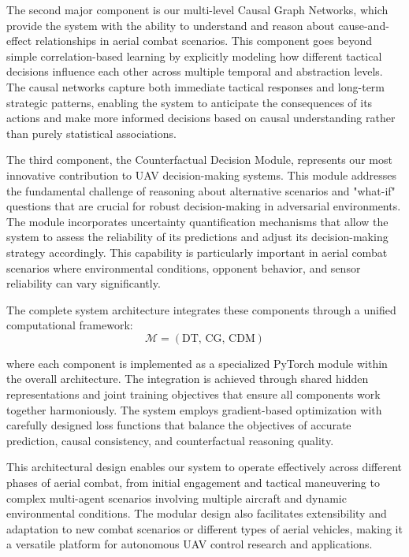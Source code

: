 \documentclass[12pt]{article}
\begin{document}
The second major component is our multi-level Causal Graph Networks, which provide the system with the ability to understand and reason about cause-and-effect relationships in aerial combat scenarios. This component goes beyond simple correlation-based learning by explicitly modeling how different tactical decisions influence each other across multiple temporal and abstraction levels. The causal networks capture both immediate tactical responses and long-term strategic patterns, enabling the system to anticipate the consequences of its actions and make more informed decisions based on causal understanding rather than purely statistical associations.

The third component, the Counterfactual Decision Module, represents our most innovative contribution to UAV decision-making systems. This module addresses the fundamental challenge of reasoning about alternative scenarios and "what-if" questions that are crucial for robust decision-making in adversarial environments. The module incorporates uncertainty quantification mechanisms that allow the system to assess the reliability of its predictions and adjust its decision-making strategy accordingly. This capability is particularly important in aerial combat scenarios where environmental conditions, opponent behavior, and sensor reliability can vary significantly.

The complete system architecture integrates these components through a unified computational framework:
\begin{equation}
\mathcal{M} = (\mathrm{DT},\, \mathrm{CG},\, \mathrm{CDM})
\end{equation}

where each component is implemented as a specialized PyTorch module within the overall architecture. The integration is achieved through shared hidden representations and joint training objectives that ensure all components work together harmoniously. The system employs gradient-based optimization with carefully designed loss functions that balance the objectives of accurate prediction, causal consistency, and counterfactual reasoning quality.

This architectural design enables our system to operate effectively across different phases of aerial combat, from initial engagement and tactical maneuvering to complex multi-agent scenarios involving multiple aircraft and dynamic environmental conditions. The modular design also facilitates extensibility and adaptation to new combat scenarios or different types of aerial vehicles, making it a versatile platform for autonomous UAV control research and applications.
\end{document}
